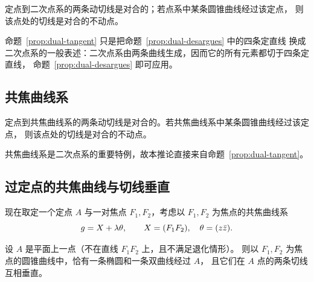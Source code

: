\begin{proposition}[二次点系的切线对合]\label{prop:dual-tangent}
定点到二次点系的两条动切线是对合的；若点系中某条圆锥曲线经过该定点，
则该点处的切线是对合的不动点。
\end{proposition}

命题~\ref{prop:dual-tangent} 只是把命题~\ref{prop:dual-desargues} 中的四条定直线
换成二次点系的一般表述：二次点系由两条曲线生成，因而它的所有元素都切于四条定直线，
命题~\ref{prop:dual-desargues} 即可应用。

\subsection{共焦曲线系}

\begin{corollary}[共焦曲线系的切线对合]\label{cor:confocal-tangent}
定点到共焦曲线系的两条动切线是对合的。若共焦曲线系中某条圆锥曲线经过该定点，
则该点处的切线是对合的不动点。
\end{corollary}

共焦曲线系是二次点系的重要特例，故本推论直接来自命题~\ref{prop:dual-tangent}。

\subsection{过定点的共焦曲线与切线垂直}

现在取定一个定点 $A$ 与一对焦点 $F_1,F_2$，考虑以 $F_1,F_2$ 为焦点的共焦曲线系
\[
g=X+\lambda\theta,\qquad X=(F_1F_2),\quad \theta=(z\bar z).
\]

\begin{proposition}[过定点的两条共焦曲线]\label{prop:two-conics}
设 $A$ 是平面上一点（不在直线 $F_1F_2$ 上，且不满足退化情形）。
则以 $F_1,F_2$ 为焦点的圆锥曲线中，恰有一条椭圆和一条双曲线经过 $A$，
且它们在 $A$ 点的两条切线互相垂直。
\end{proposition}

